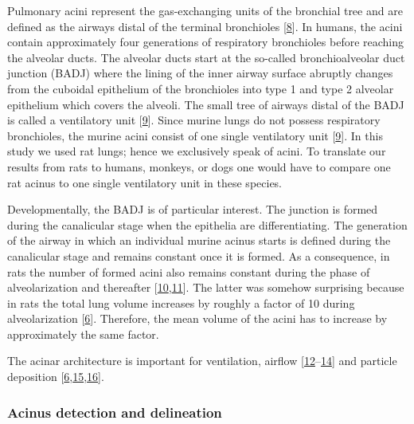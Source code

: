 \documentclass[
  american,
]{article}
\begin{document}
Pulmonary acini represent the gas-exchanging units of the bronchial tree and are defined as the airways distal of the terminal bronchioles {[}\protect\hyperlink{ref-BbEFwEVD}{8}{]}.
In humans, the acini contain approximately four generations of respiratory bronchioles before reaching the alveolar ducts.
The alveolar ducts start at the so-called bronchioalveolar duct junction (BADJ) where the lining of the inner airway surface abruptly changes from the cuboidal epithelium of the bronchioles into type 1 and type 2 alveolar epithelium which covers the alveoli.
The small tree of airways distal of the BADJ is called a ventilatory unit {[}\protect\hyperlink{ref-WDrIHn9p}{9}{]}.
Since murine lungs do not possess respiratory bronchioles, the murine acini consist of one single ventilatory unit {[}\protect\hyperlink{ref-WDrIHn9p}{9}{]}.
In this study we used rat lungs; hence we exclusively speak of acini.
To translate our results from rats to humans, monkeys, or dogs one would have to compare one rat acinus to one single ventilatory unit in these species.

Developmentally, the BADJ is of particular interest.
The junction is formed during the canalicular stage when the epithelia are differentiating.
The generation of the airway in which an individual murine acinus starts is defined during the canalicular stage and remains constant once it is formed.
As a consequence, in rats the number of formed acini also remains constant during the phase of alveolarization and thereafter {[}\protect\hyperlink{ref-14OP85b2F}{10},\protect\hyperlink{ref-uFNlWogb}{11}{]}.
The latter was somehow surprising because in rats the total lung volume increases by roughly a factor of 10 during alveolarization {[}\protect\hyperlink{ref-wnl86DEM}{6}{]}.
Therefore, the mean volume of the acini has to increase by approximately the same factor.

The acinar architecture is important for ventilation, airflow {[}\protect\hyperlink{ref-CVl41LwO}{12}--\protect\hyperlink{ref-1DP2FRUSZ}{14}{]} and particle deposition {[}\protect\hyperlink{ref-wnl86DEM}{6},\protect\hyperlink{ref-yHHhvOtP}{15},\protect\hyperlink{ref-18DcNLAv6}{16}{]}.

\hypertarget{acinus-detection-and-delineation}{%
\subsubsection{Acinus detection and delineation}\label{acinus-detection-and-delineation}}
\end{document}
